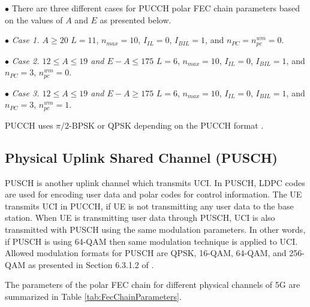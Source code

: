 $\bullet$ There are three different cases for PUCCH polar FEC chain parameters based on the values of $A$ and $E$ as presented below. \newline

$\bullet$ \emph{Case 1. $A \geq 20 $} \newline
\hspace*{2em}$L = 11$, $n_{max} = 10$, $I_{IL} = 0$, $I_{BIL} = 1$, and $n_{PC} = n_{pc}^{wm} = 0$. \newline
	 
$\bullet$ \emph{Case 2. $12 \leq A \leq 19 $ and $E-A \leq 175 $} \newline
\hspace*{2em}$L = 6$, $n_{max} = 10$, $I_{IL} = 0$, $I_{BIL} = 1$, and $n_{PC} = 3 $, $n_{pc}^{wm} = 0$. \newline

$\bullet$ \emph{Case 3. $12 \leq A \leq 19 $ and $E-A \geq 175 $} \newline
\hspace*{2em}$L = 6$, $n_{max} = 10$, $I_{IL} = 0$, $I_{BIL} = 1$, and $n_{PC} = 3 $, $n_{pc}^{wm} = 1$. \newline

PUCCH uses $\pi/2$-BPSK or QPSK depending on the PUCCH format \cite{3gpp.38.211}.

\subsection{Physical Uplink Shared Channel (PUSCH)}
PUSCH is another uplink channel which transmits UCI. In PUSCH, LDPC codes are used for encoding user data and polar codes for control information. The UE transmits UCI in PUCCH, if UE is not transmitting any user data to the base station. When UE is transmitting user data through PUSCH, UCI is also transmitted with PUSCH using the same modulation parameters. In other words, if PUSCH is using 64-QAM then same modulation technique is applied to UCI. Allowed modulation formats for PUSCH are QPSK, 16-QAM, 64-QAM, and 256-QAM as presented in Section 6.3.1.2 of \cite{3gpp.38.211}. \newline

The parameters of the polar FEC chain for different physical channels of 5G are summarized in Table \ref{tab:FecChainParameters}.

